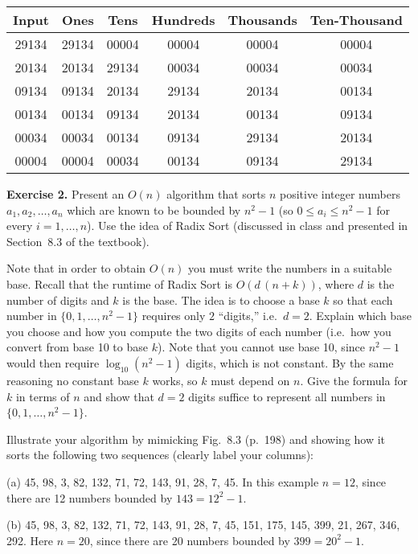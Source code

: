 \documentclass[11pt]{article}
\begin{document}
\begin{enumerate}
\begin{center}
\begin{tabular}{|c c c c c c|}
 \hline
 Input     & Ones      & Tens      & Hundreds  & Thousands  & Ten-Thousand \\
 \hline\hline
 29134 & 29134 & 00004 & 00004 & 00004 & 00004 \\
 20134 & 20134 & 29134 & 00034 & 00034 & 00034 \\
 09134 & 09134 & 20134 & 29134 & 20134 & 00134 \\
 00134 & 00134 & 09134 & 20134 & 00134 & 09134 \\
 00034 & 00034 & 00134 & 09134 & 29134 & 20134 \\
 00004 & 00004 & 00034 & 00134 & 09134 & 29134 \\
 \hline
\end{tabular}
\end{center}

\end{enumerate}
\textbf{Exercise 2.} Present an $O(n)$ algorithm that sorts $n$ positive integer numbers $a_1,a_2,\ldots,a_n$ which are known to be bounded by $n^2-1$ (so $0\le a_i\le n^2-1$ for every $i=1,\ldots,n$).  Use the idea of Radix Sort (discussed in class and presented in Section~8.3 of the textbook).

Note that in order to obtain $O(n)$ you must write the numbers in a suitable base.  Recall that the runtime of Radix Sort is $O(d\,(n+k))$, where $d$ is the number of digits and $k$ is the base.  The idea is to choose a base $k$ so that each number in $\{0,1,\ldots,n^2-1\}$ requires only $2$ “digits,” i.e.\ $d=2$.  Explain which base you choose and how you compute the two digits of each number (i.e.\ how you convert from base 10 to base $k$).  Note that you cannot use base 10, since $n^2-1$ would then require $\log_{10}(n^2-1)$ digits, which is not constant.  By the same reasoning no constant base $k$ works, so $k$ must depend on $n$.  Give the formula for $k$ in terms of $n$ and show that $d=2$ digits suffice to represent all numbers in $\{0,1,\ldots,n^2-1\}$.

Illustrate your algorithm by mimicking Fig.~8.3 (p.~198) and showing how it sorts the following two sequences (clearly label your columns):

\smallskip
(a) 45, 98, 3, 82, 132, 71, 72, 143, 91, 28, 7, 45.  
In this example $n=12$, since there are 12 numbers bounded by $143 = 12^2-1$.  
\smallskip

(b) 45, 98, 3, 82, 132, 71, 72, 143, 91, 28, 7, 45, 151, 175, 145, 399, 21, 267, 346, 292.  
Here $n=20$, since there are 20 numbers bounded by $399 = 20^2-1$.  
\end{document}
